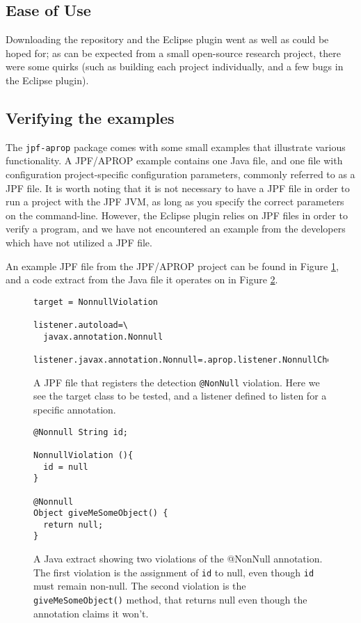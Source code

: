 \documentclass[twocolumn]{article}
\begin{document}
\subsection{Ease of Use}
Downloading the repository and the Eclipse plugin went as well as could be hoped for; as can be expected from a small open-source research project, there were some quirks (such as building each project individually, and a few bugs in the Eclipse plugin).

\subsection{Verifying the examples}
The \texttt{jpf-aprop} package comes with some small examples that illustrate various functionality. A JPF/APROP example contains one Java file, and one file with configuration project-specific configuration parameters, commonly referred to as a JPF file. It is worth noting that it is not necessary to have a JPF file in order to run a project with the JPF JVM, as long as you specify the correct parameters on the command-line. However, the Eclipse plugin relies on JPF files in order to verify a program, and we have not encountered an example from the developers which have not utilized a JPF file. 

An example JPF file from the JPF/APROP project can be found in Figure \ref{listing:jpffile}, and a code extract from the Java file it operates on in Figure \ref{listing:nonnull}.

\begin{figure}[tb]
    \lstset{language=,breaklines=true}
    \begin{lstlisting}
target = NonnullViolation

listener.autoload=\
  javax.annotation.Nonnull

listener.javax.annotation.Nonnull=.aprop.listener.NonnullChecker
    \end{lstlisting}
    \caption{A JPF file that registers the detection \texttt{@NonNull} violation. Here we see the target class to be tested, and a listener defined to listen for a specific annotation.}
    \label{listing:jpffile}
\end{figure}

\begin{figure}[tb]
    \lstset{language=java,breaklines=true}
    \begin{lstlisting}
@Nonnull String id;

NonnullViolation (){
  id = null
}

@Nonnull
Object giveMeSomeObject() {
  return null;
}

\end{lstlisting}
	\caption{A Java extract showing two violations of the @NonNull annotation. The first violation is the assignment of \texttt{id} to null, even though \texttt{id} must remain non-null. The second violation is the \texttt{giveMeSomeObject()} method, that returns null even though the annotation claims it won't.}
	    \label{listing:nonnull}
	\end{figure}
\end{document}
